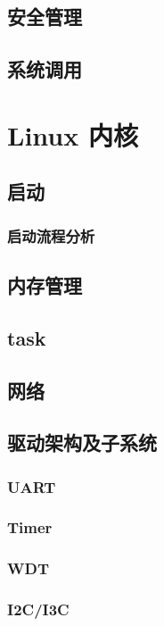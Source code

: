 \subsection{安全管理}

\subsection{系统调用}

\section{Linux 内核}

\subsection{启动}
\subsubsection{启动流程分析}

\subsection{内存管理}

\subsection{task}

\subsection{网络}

\subsection{驱动架构及子系统}
\subsubsection{UART}

\subsubsection{Timer}

\subsubsection{WDT}

\subsubsection{I2C/I3C}

